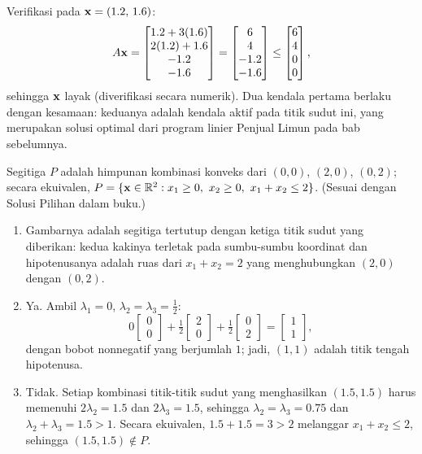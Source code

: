 Verifikasi pada $\mathbf{x} = (1.2,\, 1.6)$:
\[
A\mathbf{x} = \begin{bmatrix} 1.2 + 3(1.6) \\ 2(1.2) + 1.6 \\ -1.2 \\ -1.6 \end{bmatrix}
= \begin{bmatrix} 6 \\ 4 \\ -1.2 \\ -1.6 \end{bmatrix} \leq \begin{bmatrix} 6 \\ 4 \\ 0 \\ 0 \end{bmatrix},
\]
sehingga $\mathbf{x}$ layak (diverifikasi secara numerik). Dua kendala pertama berlaku dengan kesamaan: keduanya adalah kendala aktif pada titik sudut ini, yang merupakan solusi optimal dari program linier Penjual Limun pada bab sebelumnya.

Segitiga $P$ adalah himpunan kombinasi konveks dari $(0,0)$, $(2,0)$, $(0,2)$; secara ekuivalen, $P = \{ \mathbf{x} \in \mathbb{R}^2 : x_1 \geq 0,\ x_2 \geq 0,\ x_1 + x_2 \leq 2 \}$. (Sesuai dengan Solusi Pilihan dalam buku.)
\begin{enumerate}
\item Gambarnya adalah segitiga tertutup dengan ketiga titik sudut yang diberikan: kedua kakinya terletak pada sumbu-sumbu koordinat dan hipotenusanya adalah ruas dari $x_1 + x_2 = 2$ yang menghubungkan $(2,0)$ dengan $(0,2)$.
\item Ya. Ambil $\lambda_1 = 0$, $\lambda_2 = \lambda_3 = \tfrac12$:
\[
0 \begin{bmatrix} 0 \\ 0 \end{bmatrix} + \tfrac12 \begin{bmatrix} 2 \\ 0 \end{bmatrix} + \tfrac12 \begin{bmatrix} 0 \\ 2 \end{bmatrix} = \begin{bmatrix} 1 \\ 1 \end{bmatrix},
\]
dengan bobot nonnegatif yang berjumlah $1$; jadi, $(1,1)$ adalah titik tengah hipotenusa.
\item Tidak. Setiap kombinasi titik-titik sudut yang menghasilkan $(1.5, 1.5)$ harus memenuhi $2\lambda_2 = 1.5$ dan $2\lambda_3 = 1.5$, sehingga $\lambda_2 = \lambda_3 = 0.75$ dan $\lambda_2 + \lambda_3 = 1.5 > 1$. Secara ekuivalen, $1.5 + 1.5 = 3 > 2$ melanggar $x_1 + x_2 \leq 2$, sehingga $(1.5, 1.5) \notin P$.
\end{enumerate}


